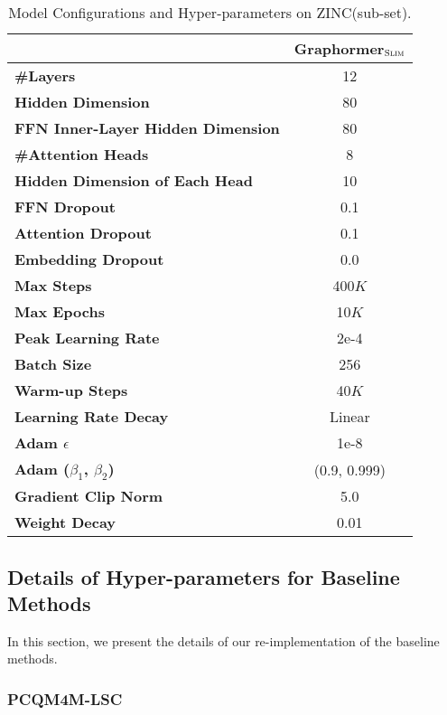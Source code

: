 \documentclass{article}
\begin{document}
\begin{table*}[ht]
\centering 
\caption{Model Configurations and Hyper-parameters on ZINC(sub-set). } \label{tab:zinc_details}
\begin{threeparttable}
\begin{tabular}{lc}
\toprule
& Graphormer$_{\small \textsc{Slim}}$ \\ \hline
\textbf{\#Layers} & 12  \\ 
\textbf{Hidden Dimension} & 80  \\ 
\textbf{FFN Inner-Layer Hidden Dimension} & 80  \\ 
\textbf{\#Attention Heads} & 8  \\ 
\textbf{Hidden Dimension of Each Head} & 10  \\ 
\textbf{FFN Dropout} & 0.1  \\ 
\textbf{Attention Dropout} & 0.1 \\ 
\textbf{Embedding Dropout} & 0.0 \\ 
\textbf{Max Steps} & 400$K$ \\
\textbf{Max Epochs} & 10$K$  \\ 
\textbf{Peak Learning Rate} & 2e-4  \\ 
\textbf{Batch Size} & 256 \\ 
\textbf{Warm-up Steps} & 40$K$ \\ 
\textbf{Learning Rate Decay} & Linear \\ 
\textbf{Adam $\epsilon$} & 1e-8 \\ 
\textbf{Adam ($\beta_1$, $\beta_2$)} &  (0.9, 0.999) \\ 
\textbf{Gradient Clip Norm} &  5.0  \\ 
\textbf{Weight Decay} & 0.01 \\ 
\bottomrule
\end{tabular}
\end{threeparttable}
\end{table*}

\subsection{Details of Hyper-parameters for Baseline Methods}
In this section, we present the details of our re-implementation of the baseline methods.

\subsubsection{PCQM4M-LSC}
\end{document}
